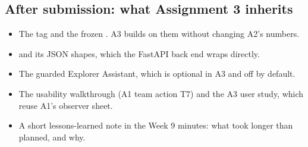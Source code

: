 \subsection{After submission: what Assignment 3 inherits}

\begin{itemize}
  \item The tag  and the frozen . A3 builds on them without changing
    A2's numbers.
  \item {} and its JSON shapes, which the FastAPI back end wraps directly.
  \item The guarded Explorer Assistant, which is optional in A3 and off by default.
  \item The usability walkthrough (A1 team action T7) and the A3 user study, which reuse A1's
    observer sheet.
  \item A short lessons-learned note in the Week 9 minutes: what took longer than planned, and why.
\end{itemize}
